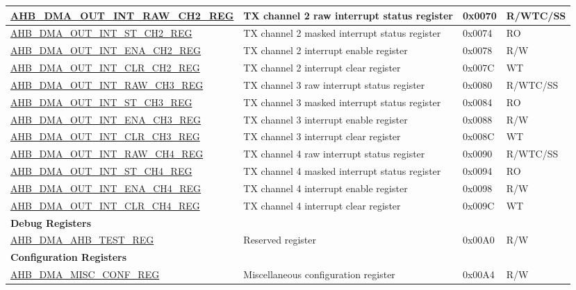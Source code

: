 \begin{longtable}{ | l | p{10cm} | p{1.3cm} | l | }
\hyperref[regdesc:AHBDMAOUTINTRAWCHNREG]{AHB\_DMA\_OUT\_INT\_RAW\_CH2\_REG} & TX channel 2 raw interrupt status register & 0x0070 & R/WTC/SS \\ \hline
\hyperref[regdesc:AHBDMAOUTINTSTCHNREG]{AHB\_DMA\_OUT\_INT\_ST\_CH2\_REG} & TX channel 2 masked interrupt status register & 0x0074 & RO \\ \hline
\hyperref[regdesc:AHBDMAOUTINTENACHNREG]{AHB\_DMA\_OUT\_INT\_ENA\_CH2\_REG} & TX channel 2 interrupt enable register & 0x0078 & R/W \\ \hline
\hyperref[regdesc:AHBDMAOUTINTCLRCHNREG]{AHB\_DMA\_OUT\_INT\_CLR\_CH2\_REG} & TX channel 2 interrupt clear register & 0x007C & WT \\ \hline
\hyperref[regdesc:AHBDMAOUTINTRAWCHNREG]{AHB\_DMA\_OUT\_INT\_RAW\_CH3\_REG} & TX channel 3 raw interrupt status register & 0x0080 & R/WTC/SS \\ \hline
\hyperref[regdesc:AHBDMAOUTINTSTCHNREG]{AHB\_DMA\_OUT\_INT\_ST\_CH3\_REG} & TX channel 3 masked interrupt status register & 0x0084 & RO \\ \hline
\hyperref[regdesc:AHBDMAOUTINTENACHNREG]{AHB\_DMA\_OUT\_INT\_ENA\_CH3\_REG} & TX channel 3 interrupt enable register & 0x0088 & R/W \\ \hline
\hyperref[regdesc:AHBDMAOUTINTCLRCHNREG]{AHB\_DMA\_OUT\_INT\_CLR\_CH3\_REG} & TX channel 3 interrupt clear register & 0x008C & WT \\ \hline
\hyperref[regdesc:AHBDMAOUTINTRAWCHNREG]{AHB\_DMA\_OUT\_INT\_RAW\_CH4\_REG} & TX channel 4 raw interrupt status register & 0x0090 & R/WTC/SS \\ \hline
\hyperref[regdesc:AHBDMAOUTINTSTCHNREG]{AHB\_DMA\_OUT\_INT\_ST\_CH4\_REG} & TX channel 4 masked interrupt status register & 0x0094 & RO \\ \hline
\hyperref[regdesc:AHBDMAOUTINTENACHNREG]{AHB\_DMA\_OUT\_INT\_ENA\_CH4\_REG} & TX channel 4 interrupt enable register & 0x0098 & R/W \\ \hline
\hyperref[regdesc:AHBDMAOUTINTCLRCHNREG]{AHB\_DMA\_OUT\_INT\_CLR\_CH4\_REG} & TX channel 4 interrupt clear register & 0x009C & WT \\ \hline
\multicolumn{4}{|l|}{\textbf{Debug Registers}} \\ \hline
\hyperref[regdesc:AHBDMAAHBTESTREG]{AHB\_DMA\_AHB\_TEST\_REG} & Reserved register & 0x00A0 & R/W \\ \hline
\multicolumn{4}{|l|}{\textbf{Configuration Registers}} \\ \hline
\hyperref[regdesc:AHBDMAMISCCONFREG]{AHB\_DMA\_MISC\_CONF\_REG} & Miscellaneous configuration register & 0x00A4 & R/W \\ \hline

\end{longtable}
